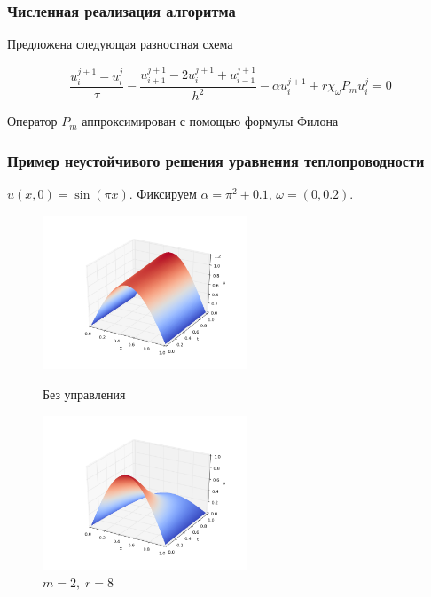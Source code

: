 \documentclass{beamer}
\begin{document}
\begin{frame}
    \frametitle{Численная реализация алгоритма}
    Предложена следующая разностная схема \\
    \begin{block}{}
        \begin{equation}\label{scheme}
            \frac{u^{j + 1}_i - u^j_i}{\tau} - \frac{u_{i + 1}^{j + 1} - 2u_{i}^{j + 1} + u_{i - 1}^{j + 1}}{h^2} - \alpha u^{j + 1}_i + r\chi_{\omega}P_m u^j_i = 0
        \end{equation}
    \end{block}

    Оператор $P_m$ аппроксимирован с помощью формулы Филона\\

\end{frame}

\begin{frame}
    \frametitle{Пример неустойчивого решения уравнения теплопроводности}

    $u(x, 0) = \sin{(\pi x)}$. Фиксируем $\alpha = \pi^2 + 0.1$, $\omega = (0, 0.2)$.


    \begin{figure}[H]
        \centering
        \begin{minipage}{.5\textwidth}
            \centering
            \includegraphics[width=2.4in]{par_ex_pi01}
            \caption{Без управления}
            \label{fig:test1}
        \end{minipage}%
        \begin{minipage}{.5\textwidth}
            \centering
            \includegraphics[width=2.4in]{par_re_pi01}
            \caption{$m = 2,\; r = 8$}
            \label{fig:test2}
        \end{minipage}
    \end{figure}

\end{frame}
\end{document}
